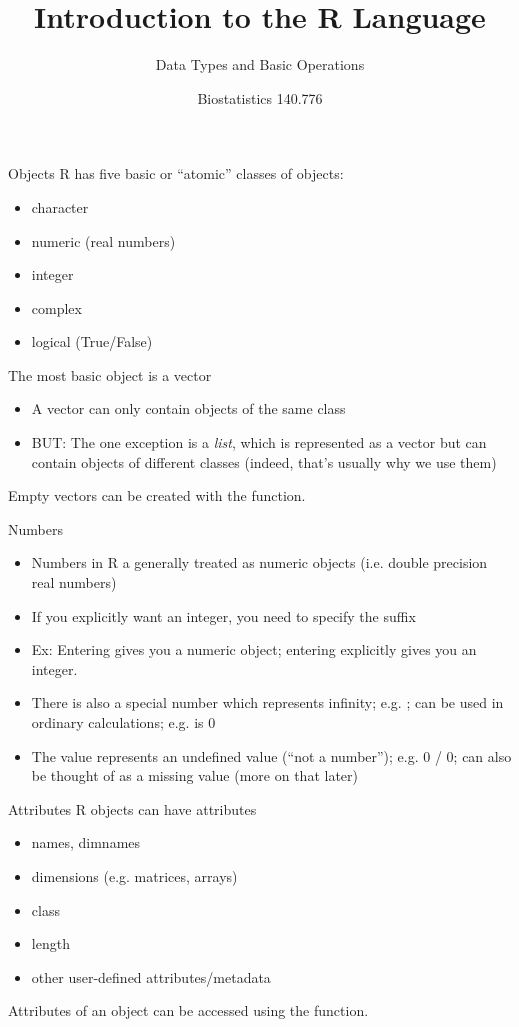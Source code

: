 \documentclass[aspectratio=169]{beamer}
\title[The R Language]{Introduction to the R Language}
\subtitle{Data Types and Basic Operations}
\date{Biostatistics 140.776}
\begin{document}
\begin{frame}
  \titlepage
\end{frame}


\begin{frame}{Objects}
R has five basic or ``atomic'' classes of objects:
\begin{itemize}
\item
character
\item
numeric (real numbers)
\item
integer
\item
complex
\item
logical  (True/False)
\end{itemize}
The most basic object is a vector
\begin{itemize}
\item
A vector can only contain objects of the same class
\item
BUT: The one exception is a \textit{list}, which is represented as a
vector but can contain objects of different classes (indeed, that's
usually why we use them)
\end{itemize}
Empty vectors can be created with the  function.
\end{frame}

\begin{frame}{Numbers}
\begin{itemize}
\item
Numbers in R a generally treated as numeric objects (i.e. double
precision real numbers)
\item
If you explicitly want an integer, you need to specify the 
suffix
\item
Ex: Entering  gives you a numeric object; entering 
explicitly gives you an integer. 
\item
There is also a special number  which represents infinity;
e.g.  ;  can be used in ordinary calculations;
e.g.  is 0
\item
The value  represents an undefined value (``not a number'');
e.g. 0 / 0;  can also be thought of as a missing value (more
on that later)
\end{itemize}
\end{frame}

\begin{frame}{Attributes}
R objects can have attributes
\begin{itemize}
\item
names, dimnames
\item
dimensions (e.g. matrices, arrays)
\item
class
\item
length
\item
other user-defined attributes/metadata
\end{itemize}
Attributes of an object can be accessed using the 
function.
\end{frame}
\end{document}

